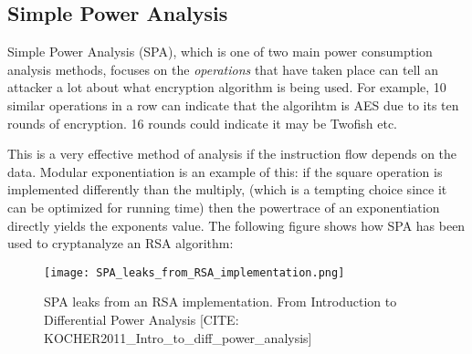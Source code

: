\subsection{Simple Power Analysis}
Simple Power Analysis (SPA), which is one of two main power consumption analysis methods, focuses on the \emph{operations} that have taken place can tell an attacker a lot about what encryption algorithm is being used.
For example, 10 similar operations in a row can indicate that the algorihtm is AES due to its ten rounds of encryption. 16 rounds could indicate it may be Twofish etc.

This is a very effective method of analysis if the instruction flow depends on the data. 
Modular exponentiation is an example of this: if the square operation is implemented differently than the multiply, (which is a tempting choice since it can be optimized for running time) then the powertrace of an exponentiation directly yields the exponents value.
The following figure shows how SPA has been used to cryptanalyze an RSA algorithm:
\begin{figure}[h!]
  \begin{center}
    \texttt{[image: SPA\_leaks\_from\_RSA\_implementation.png]} \\
  \end{center}
  \caption[caption]{SPA leaks from an RSA implementation. \hspace{\textwidth} From Introduction to Differential Power Analysis [CITE: KOCHER2011\_Intro\_to\_diff\_power\_analysis]}
\end{figure}


